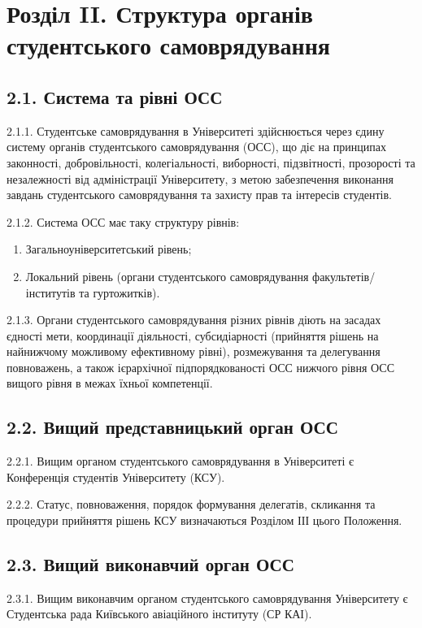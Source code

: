 \section*{Розділ II. Структура органів студентського самоврядування}

\subsection*{2.1. Система та рівні ОСС}
    2.1.1. Студентське самоврядування в Університеті здійснюється через єдину систему органів студентського самоврядування (ОСС), що діє на принципах законності, добровільності, колегіальності, виборності, підзвітності, прозорості та незалежності від адміністрації Університету, з метою забезпечення виконання завдань студентського самоврядування та захисту прав та інтересів студентів.

    2.1.2. Система ОСС має таку структуру рівнів:
        \begin{enumerate}[label=\alph*)]
            \item Загальноуніверситетський рівень;
            \item Локальний рівень (органи студентського самоврядування факультетів/інститутів та гуртожитків).
        \end{enumerate}

    2.1.3. Органи студентського самоврядування різних рівнів діють на засадах єдності мети, координації діяльності, субсидіарності (прийняття рішень на найнижчому можливому ефективному рівні), розмежування та делегування повноважень, а також ієрархічної підпорядкованості ОСС нижчого рівня ОСС вищого рівня в межах їхньої компетенції.

\subsection*{2.2. Вищий представницький орган ОСС}
    2.2.1. Вищим органом студентського самоврядування в Університеті є Конференція студентів Університету (КСУ).

    2.2.2. Статус, повноваження, порядок формування делегатів, скликання та процедури прийняття рішень КСУ визначаються Розділом ІІІ цього Положення.

\subsection*{2.3. Вищий виконавчий орган ОСС}
    2.3.1. Вищим виконавчим органом студентського самоврядування Університету є Студентська рада Київського авіаційного інституту (СР КАІ).

